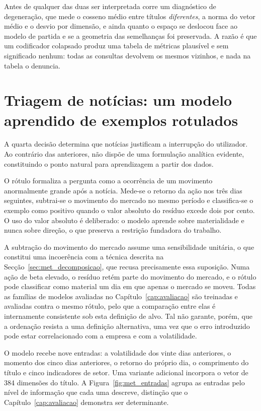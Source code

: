 Antes de qualquer das duas ser interpretada corre um diagnóstico de degeneração, que mede o
cosseno médio entre títulos \emph{diferentes}, a norma do vetor médio e o desvio por dimensão, e
ainda quanto o espaço se deslocou face ao modelo de partida e se a geometria das semelhanças foi
preservada. A razão é que um codificador colapsado produz uma tabela de métricas plausível e sem
significado nenhum: todas as consultas devolvem os mesmos vizinhos, e nada na tabela o denuncia.


\section{Triagem de notícias: um modelo aprendido de exemplos rotulados}
\label{sec:met_triagem}

A quarta decisão determina que notícias justificam a interrupção do utilizador. Ao contrário das
anteriores, não dispõe de uma formulação analítica evidente, constituindo o ponto natural para
aprendizagem a partir dos dados.

O rótulo formaliza a pergunta como a ocorrência de um movimento anormalmente grande após a
notícia. Mede-se o retorno da ação nos três dias seguintes, subtrai-se o movimento do mercado no
mesmo período e classifica-se o exemplo como positivo quando o valor absoluto do resíduo excede
dois por cento. O uso do valor absoluto é deliberado: o modelo aprende sobre materialidade e nunca
sobre direção, o que preserva a restrição fundadora do trabalho.

A subtração do movimento do mercado assume uma sensibilidade unitária, o que constitui uma
incoerência com a técnica descrita na Secção~\ref{sec:met_decomposicao}, que recusa precisamente
essa suposição. Numa ação de beta elevado, o resíduo retém parte do movimento do mercado, e o
rótulo pode classificar como material um dia em que apenas o mercado se moveu. Todas as famílias de
modelos avaliadas no Capítulo~\ref{cap:avaliacao} são treinadas e avaliadas contra o mesmo rótulo,
pelo que a comparação entre elas é internamente consistente sob esta definição de alvo. Tal não
garante, porém, que a ordenação resista a uma definição alternativa, uma vez que o erro introduzido
pode estar correlacionado com a empresa e com a volatilidade.

O modelo recebe nove entradas: a volatilidade dos vinte dias anteriores, o momento dos cinco dias
anteriores, o retorno do próprio dia, o comprimento do título e cinco indicadores de setor. Uma
variante adicional incorpora o vetor de 384 dimensões do título. A Figura~\ref{fig:met_entradas}
agrupa as entradas pelo nível de informação que cada uma descreve, distinção que o
Capítulo~\ref{cap:avaliacao} demonstra ser determinante.

